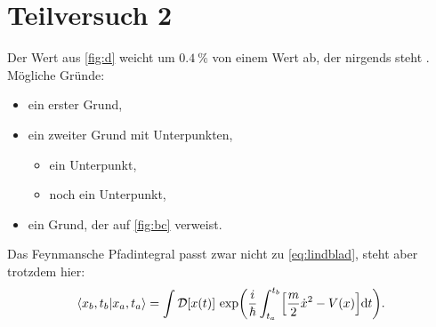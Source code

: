 \section{Teilversuch 2}

\blindtext

Der Wert aus \cref{fig:d} weicht um $\qty{0.4}{\percent}$ von einem Wert
ab, der nirgends steht \cite{zinth_optik_2018}. Mögliche Gründe:
\begin{itemize}
  \item ein erster Grund,
  \item ein zweiter Grund mit Unterpunkten,
    \begin{itemize}
      \item ein Unterpunkt,
      \item noch ein Unterpunkt,
    \end{itemize}
  \item ein Grund, der auf \cref{fig:bc} verweist.
\end{itemize}

Das Feynmansche Pfadintegral passt zwar nicht zu \cref{eq:lindblad},
steht aber trotzdem hier:
\begin{equation}
  \langle x_{b}, t_{b} \vert x_{a}, t_{a} \rangle
  = \int \mathcal{D}[x(t)]\,
    \exp\biggl( \frac{i}{\hbar} \int_{t_{a}}^{t_{b}}
    \Bigl[ \frac{m}{2}\dot x^{2} - V(x) \Bigr] \mathrm{d}t \biggr) .
  \label{eq:pfadintegral}
\end{equation}

\blindtext
